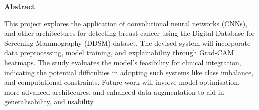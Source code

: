 \thispagestyle{plain}
\makeatletter
\begin{center}
    \Large
    \textbf{\@title}
        
    \vspace{0.4cm}
    \large
    \projectSubtitle
        
    \vspace{0.4cm}
    \textbf{\@author}
       
    \vspace{0.9cm}
    \textbf{Abstract}
\end{center}
\makeatother

This project explores the application of convolutional neural networks (CNNs), and other architectures for detecting breast cancer using the Digital Database for Screening Mammography (DDSM) dataset. The devised system will incorporate data preprocessing, model training, and explainability through Grad-CAM heatmaps. The study evaluates the model's feasibility for clinical integration, indicating the potential difficulties in adopting such systems like class imbalance, and computational constraints. Future work will involve model optimisation, more advanced architecures, and enhanced data augmentation to aid in generalisability, and usability.
